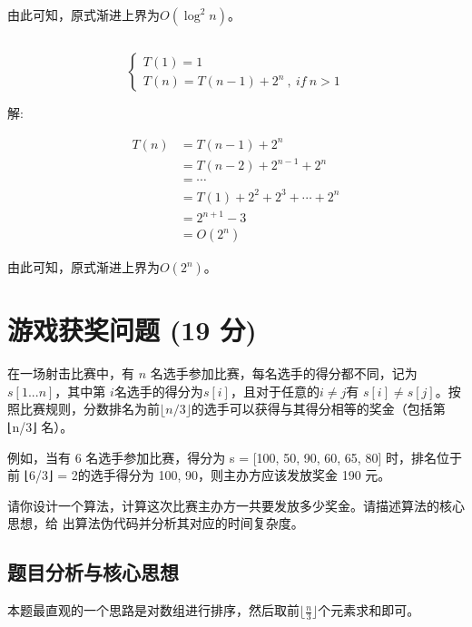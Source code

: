 \documentclass{article}
\begin{document}
\quad\quad\quad\quad 由此可知，原式渐进上界为$O(\log^2 n)$。


\subsection{}

$$
\left\{
\begin{array}{l}
T(1) = 1\\
T(n) = T(n-1) +2^n\ ,\ if \ n>1
\end{array}
\right.
$$

解:

\begin{align*}
T(n)&=T(n-1) + 2^n \\
    &=T(n-2) + 2^{n-1} + 2^n \\
    &=\cdots\\
    &=T(1) + 2^2 + 2^3 + \cdots + 2^n\\
    &=2^{n+1} - 3\\
    &=O(2^n)
\end{align*}

\quad\quad\quad\quad 由此可知，原式渐进上界为$O(2^n)$。


\section{游戏获奖问题 (19 分)} %


在一场射击比赛中，有 $n$ 名选手参加比赛，每名选手的得分都不同，记为 $s[1...n]$，其中第 $i$名选手的得分为$ s[i]$，且对于任意的$ i\ne j $有 $s[i]  \ne s[j]$。按照比赛规则，分数排名为前$ \lfloor n/3\rfloor $的选手可以获得与其得分相等的奖金（包括第 ⌊n/3⌋ 名）。

例如，当有 6 名选手参加比赛，得分为 s = [100, 50, 90, 60, 65, 80] 时，排名位于前 ⌊6/3⌋ = 2的选手得分为 100, 90，则主办方应该发放奖金 190 元。

请你设计一个算法，计算这次比赛主办方一共要发放多少奖金。请描述算法的核心思想，给
出算法伪代码并分析其对应的时间复杂度。

\subsection{题目分析与核心思想} %

本题最直观的一个思路是对数组进行排序，然后取前$\lfloor \frac{n}{3}\rfloor$个元素求和即可。
\end{document}
